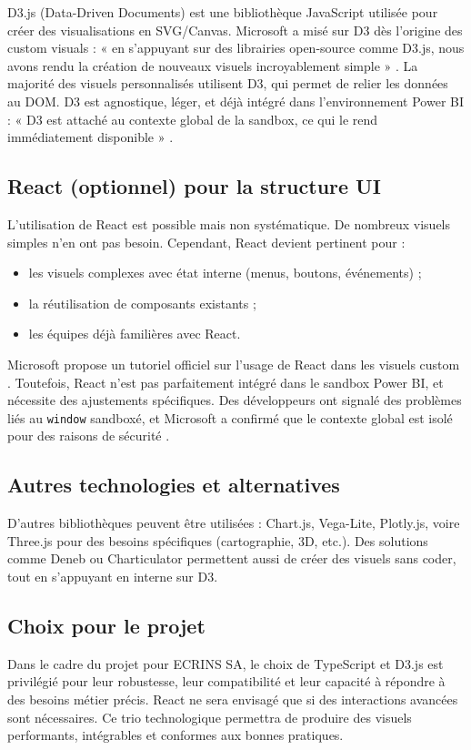 D3.js (Data-Driven Documents) est une bibliothèque JavaScript utilisée pour créer des visualisations en SVG/Canvas. Microsoft a misé sur D3 dès l’origine des custom visuals : « en s’appuyant sur des librairies open-source comme D3.js, nous avons rendu la création de nouveaux visuels incroyablement simple » \cite{powerbi-d3}. La majorité des visuels personnalisés utilisent D3, qui permet de relier les données au DOM. D3 est agnostique, léger, et déjà intégré dans l’environnement Power BI : « D3 est attaché au contexte global de la sandbox, ce qui le rend immédiatement disponible » \cite{fabric-d3-sandbox}.

\subsection{React (optionnel) pour la structure UI}

L’utilisation de React est possible mais non systématique. De nombreux visuels simples n’en ont pas besoin. Cependant, React devient pertinent pour :
\begin{itemize}
  \item les visuels complexes avec état interne (menus, boutons, événements) ;
  \item la réutilisation de composants existants ;
  \item les équipes déjà familières avec React.
\end{itemize}
Microsoft propose un tutoriel officiel sur l’usage de React dans les visuels custom \cite{ms-react-circlecard}. Toutefois, React n’est pas parfaitement intégré dans le sandbox Power BI, et nécessite des ajustements spécifiques. Des développeurs ont signalé des problèmes liés au \texttt{window} sandboxé, et Microsoft a confirmé que le contexte global est isolé pour des raisons de sécurité \cite{fabric-react-sandbox}.

\subsection{Autres technologies et alternatives}

D’autres bibliothèques peuvent être utilisées : Chart.js, Vega-Lite, Plotly.js, voire Three.js pour des besoins spécifiques (cartographie, 3D, etc.). Des solutions comme Deneb ou Charticulator permettent aussi de créer des visuels sans coder, tout en s’appuyant en interne sur D3.

\subsection{Choix pour le projet}

Dans le cadre du projet pour ECRINS SA, le choix de TypeScript et D3.js est privilégié pour leur robustesse, leur compatibilité et leur capacité à répondre à des besoins métier précis. React ne sera envisagé que si des interactions avancées sont nécessaires. Ce trio technologique permettra de produire des visuels performants, intégrables et conformes aux bonnes pratiques.

